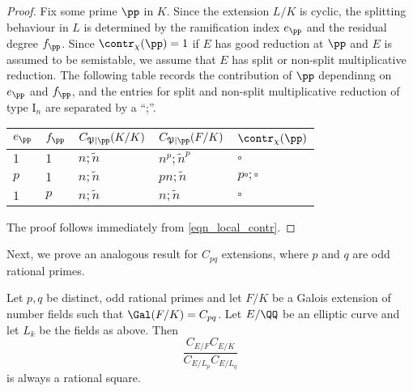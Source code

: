 \begin{proof}
    Fix some prime $\pp$ in $K$. Since the extension $L/K$ is cyclic, the splitting behaviour in $L$ is determined by the ramification index $e_\pp$ and the residual degree $f_\pp$. Since $\contr_\chi(\pp)=1$ if $E$ has good reduction at $\pp$ and $E$ is assumed to be semistable, we assume that $E$ has split or non-split multiplicative reduction. The following table records the contribution of $\pp$ dependinng on $e_\pp$ and $f_\pp$, and the entries for split and non-split multiplicative reduction of type $\mathrm{I}_n$ are separated by a ``;''.
    \begin{table}[h!]
        \centering
        \begin{tabular}{|l|l|l|l|l|}
        \hline
        $e_\pp$ & $f_\pp$  & $C_{\mathfrak{P}\mid \pp}(K/K)$ & $C_{\mathfrak{P}\mid \pp}(F/K)$  & $\contr_\chi(\pp)$ \\ \hline
        $1$ & $1$ & $n;\tilde{n}$ & $n^p;\tilde{n}^p$ & $\square$ \\ \hline
        $p$ & $1$ & $n;\tilde{n}$ & $pn;\tilde{n}$ & $p\square;\square$ \\ \hline
        $1$ & $p$ & $n;\tilde{n}$ & $n;\tilde{n}$ & $\square$ \\ \hline
        \end{tabular}
    \end{table}
    The proof follows immediately from \eqref{eqn_local_contr}.
\end{proof}

Next, we prove an analogous result for $C_{pq}$ extensions, where $p$ and $q$ are odd rational primes.

\begin{lemma}\label{lem_Cpq}
    Let $p,q$ be distinct, odd rational primes and let $F/K$ be a Galois extension of number fields such that $\Gal(F/K)=C_{pq}$. Let $E/\QQ$ be an elliptic curve and let $L_k$ be the fields as above. Then
    $$\frac{C_{E/F}C_{E/K}}{C_{E/L_p}C_{E/L_q}}$$
    is always a rational square.
\end{lemma}

